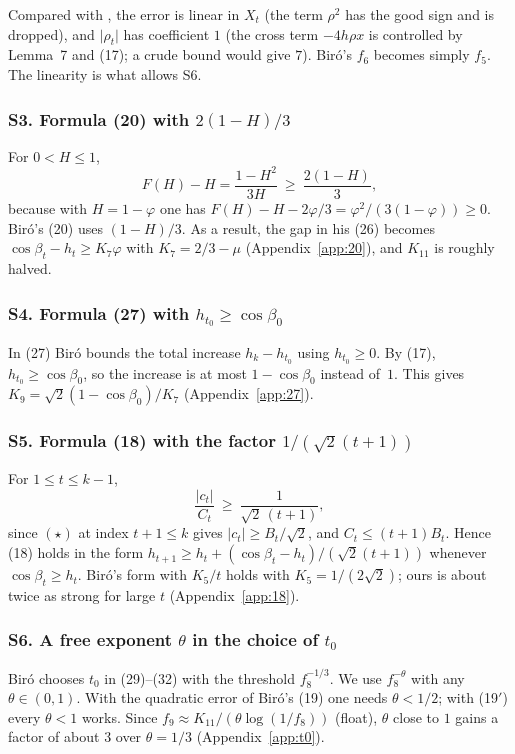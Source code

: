 \documentclass[11pt]{amsart}
\theoremstyle{remark}
\theoremstyle{plain}
\newcommand{\abs}[1]{\lvert #1\rvert}
\begin{document}
Compared with \cite{Bir00b}, the error is linear in $X_t$ (the term $\rho^2$ has the good sign and is dropped), and $\abs{\rho_t}$ has coefficient $1$ (the cross term $-4h\rho x$ is controlled by Lemma~7 and (17); a crude bound would give $7$). Bir\'o's $f_6$ becomes simply $f_5$. The linearity is what allows S6.

\subsubsection*{S3. Formula (20) with $2(1-H)/3$}
For $0<H\le1$,
\begin{equation}\tag{20$'$}
  F(H)-H=\frac{1-H^2}{3H}\ \ge\ \frac{2(1-H)}3,
\end{equation}
because with $H=1-\varphi$ one has $F(H)-H-2\varphi/3=\varphi^2/(3(1-\varphi))\ge0$. Bir\'o's (20) uses $(1-H)/3$. As a result, the gap in his (26) becomes $\cos\beta_t-h_t\ge K_7\varphi$ with $K_7=2/3-\mu$ (Appendix~\ref{app:20}), and $K_{11}$ is roughly halved.

\subsubsection*{S4. Formula (27) with $h_{t_0}\ge\cos\beta_0$}
In (27) Bir\'o bounds the total increase $h_k-h_{t_0}$ using $h_{t_0}\ge0$. By (17), $h_{t_0}\ge\cos\beta_0$, so the increase is at most $1-\cos\beta_0$ instead of~$1$. This gives $K_9=\sqrt2(1-\cos\beta_0)/K_7$ (Appendix~\ref{app:27}).

\subsubsection*{S5. Formula (18) with the factor $1/(\sqrt2(t+1))$}
For $1\le t\le k-1$,
\begin{equation}\tag{18b}
  \frac{\abs{c_t}}{C_t}\ \ge\ \frac1{\sqrt2\,(t+1)},
\end{equation}
since $(\star)$ at index $t+1\le k$ gives $\abs{c_t}\ge B_t/\sqrt2$, and $C_t\le(t+1)B_t$. Hence (18) holds in the form $h_{t+1}\ge h_t+(\cos\beta_t-h_t)/(\sqrt2(t+1))$ whenever $\cos\beta_t\ge h_t$. Bir\'o's form with $K_5/t$ holds with $K_5=1/(2\sqrt2)$; ours is about twice as strong for large $t$ (Appendix~\ref{app:18}).

\subsubsection*{S6. A free exponent $\theta$ in the choice of $t_0$}
Bir\'o chooses $t_0$ in (29)--(32) with the threshold $f_8^{-1/3}$. We use $f_8^{-\theta}$ with any $\theta\in(0,1)$. With the quadratic error of Bir\'o's (19) one needs $\theta<1/2$; with (19$'$) every $\theta<1$ works. Since $f_9\approx K_{11}/(\theta\log(1/f_8))$ (float), $\theta$ close to $1$ gains a factor of about $3$ over $\theta=1/3$ (Appendix~\ref{app:t0}).
\end{document}
